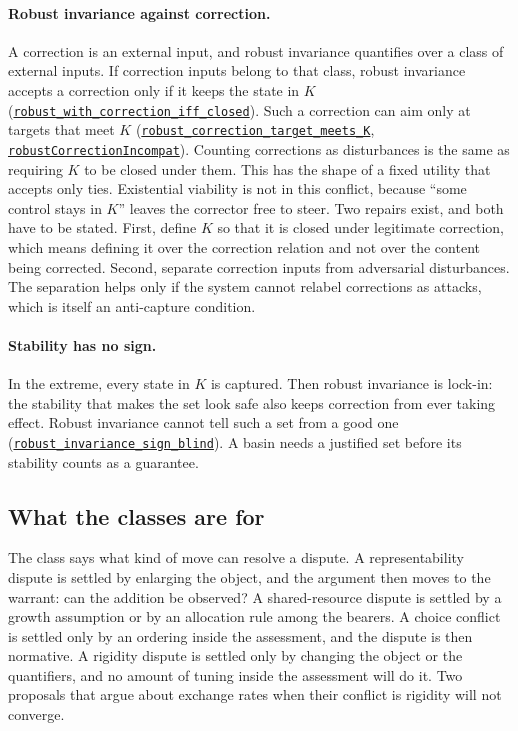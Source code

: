 \documentclass[11pt]{article}
\newcommand{\lean}[1]{\hyperref[lean:#1]{\nolinkurl{#1}}}
\begin{document}
\paragraph{Robust invariance against correction.}
A correction is an external input, and robust invariance quantifies over a class of external inputs.
If correction inputs belong to that class, robust invariance accepts a correction only if it keeps the state in $K$ (\lean{robust_with_correction_iff_closed}).
Such a correction can aim only at targets that meet $K$ (\lean{robust_correction_target_meets_K}, \lean{robustCorrectionIncompat}).
Counting corrections as disturbances is the same as requiring $K$ to be closed under them.
This has the shape of a fixed utility that accepts only ties.
Existential viability is not in this conflict, because ``some control stays in $K$'' leaves the corrector free to steer.
Two repairs exist, and both have to be stated.
First, define $K$ so that it is closed under legitimate correction, which means defining it over the correction relation and not over the content being corrected.
Second, separate correction inputs from adversarial disturbances.
The separation helps only if the system cannot relabel corrections as attacks, which is itself an anti-capture condition.

\paragraph{Stability has no sign.}
In the extreme, every state in $K$ is captured.
Then robust invariance is lock-in: the stability that makes the set look safe also keeps correction from ever taking effect.
Robust invariance cannot tell such a set from a good one (\lean{robust_invariance_sign_blind}).
A basin needs a justified set before its stability counts as a guarantee.

\subsection{What the classes are for}

The class says what kind of move can resolve a dispute.
A representability dispute is settled by enlarging the object, and the argument then moves to the warrant: can the addition be observed?
A shared-resource dispute is settled by a growth assumption or by an allocation rule among the bearers.
A choice conflict is settled only by an ordering inside the assessment, and the dispute is then normative.
A rigidity dispute is settled only by changing the object or the quantifiers, and no amount of tuning inside the assessment will do it.
Two proposals that argue about exchange rates when their conflict is rigidity will not converge.
\end{document}
